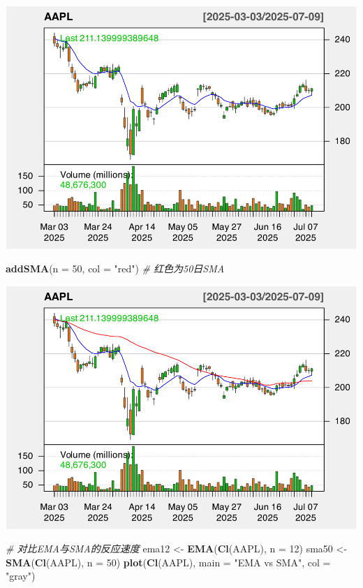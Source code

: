 \documentclass[]{ctexbook}
\newenvironment{Shaded}{\begin{snugshade}}{\end{snugshade}}
\newcommand{\AttributeTok}[1]{\textcolor[rgb]{0.13,0.29,0.53}{#1}}
\newcommand{\CommentTok}[1]{\textcolor[rgb]{0.56,0.35,0.01}{\textit{#1}}}
\newcommand{\DecValTok}[1]{\textcolor[rgb]{0.00,0.00,0.81}{#1}}
\newcommand{\FunctionTok}[1]{\textcolor[rgb]{0.13,0.29,0.53}{\textbf{#1}}}
\newcommand{\NormalTok}[1]{#1}
\newcommand{\OtherTok}[1]{\textcolor[rgb]{0.56,0.35,0.01}{#1}}
\newcommand{\StringTok}[1]{\textcolor[rgb]{0.31,0.60,0.02}{#1}}
\begin{document}
\includegraphics[width=0.9\linewidth]{quantmod_files/figure-latex/ema-2}

\begin{Shaded}
\begin{Highlighting}[]
\FunctionTok{addSMA}\NormalTok{(}\AttributeTok{n =} \DecValTok{50}\NormalTok{, }\AttributeTok{col =} \StringTok{"red"}\NormalTok{)     }\CommentTok{\# 红色为50日SMA}
\end{Highlighting}
\end{Shaded}

\includegraphics[width=0.9\linewidth]{quantmod_files/figure-latex/ema-3}

\begin{Shaded}
\begin{Highlighting}[]
\CommentTok{\# 对比EMA与SMA的反应速度}
\NormalTok{ema12 }\OtherTok{\textless{}{-}} \FunctionTok{EMA}\NormalTok{(}\FunctionTok{Cl}\NormalTok{(AAPL), }\AttributeTok{n =} \DecValTok{12}\NormalTok{)}
\NormalTok{sma50 }\OtherTok{\textless{}{-}} \FunctionTok{SMA}\NormalTok{(}\FunctionTok{Cl}\NormalTok{(AAPL), }\AttributeTok{n =} \DecValTok{50}\NormalTok{)}
\FunctionTok{plot}\NormalTok{(}\FunctionTok{Cl}\NormalTok{(AAPL), }\AttributeTok{main =} \StringTok{"EMA vs SMA"}\NormalTok{, }\AttributeTok{col =} \StringTok{"gray"}\NormalTok{)}
\end{Highlighting}
\end{Shaded}
\end{document}
